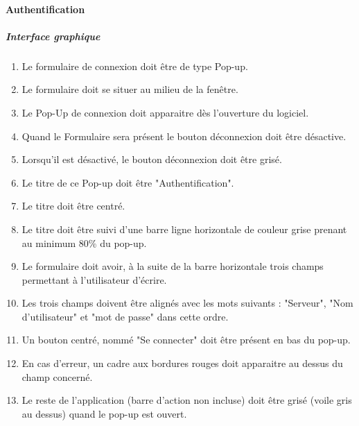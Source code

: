 \documentclass[10pt,a4paper]{report}
\begin{document}
\paragraph{Authentification}

	\subparagraph{Interface graphique}\label{ClientIGA} 
	\begin{enumerate}
		\item Le formulaire de connexion doit être de type Pop-up.
		\item Le formulaire doit se situer au milieu de la fenêtre.
		\item Le Pop-Up de connexion doit apparaitre dès l'ouverture du logiciel.
		\item Quand le Formulaire sera présent le bouton déconnexion doit être désactive.
		\item Lorsqu'il est désactivé, le bouton déconnexion doit être grisé.
		\item Le titre de ce Pop-up doit être "Authentification".
		\item Le titre doit être centré.
		\item Le titre doit être suivi d'une barre ligne horizontale de couleur grise prenant au minimum 80\% du pop-up.
		\item Le formulaire doit avoir, à la suite de la barre horizontale trois champs permettant à l'utilisateur d'écrire.
		\item Les trois champs doivent être alignés avec les mots suivants : "Serveur", "Nom d'utilisateur" et "mot de passe" dans cette ordre.
		\item Un bouton centré, nommé "Se connecter" doit être présent en bas du pop-up.
		\item En cas d'erreur, un cadre aux bordures rouges doit apparaitre au dessus du champ concerné.
		\item Le reste de l'application (barre d'action non incluse) doit être grisé (voile gris au dessus) quand le pop-up est ouvert.
	\end{enumerate}
	
\end{document}
